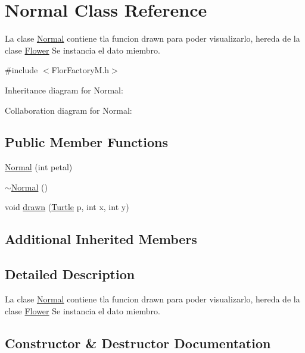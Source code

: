 \hypertarget{classNormal}{}\section{Normal Class Reference}
\label{classNormal}


La clase \hyperlink{classNormal}{Normal} contiene tla funcion drawn para poder visualizarlo, hereda de la clase \hyperlink{classFlower}{Flower}  Se instancia el dato miembro.  




{\ttfamily \#include $<$Flor\+Factory\+M.\+h$>$}



Inheritance diagram for Normal\+:


Collaboration diagram for Normal\+:
\subsection*{Public Member Functions}
\begin{DoxyCompactItemize}
\item 
\hyperlink{classNormal_a03794b0d59e12a6e9c073a596d7709fb}{Normal} (int petal)
\item 
\hyperlink{classNormal_a2ed547e3b7361c3675224d352cf79740}{$\sim$\+Normal} ()
\item 
void \hyperlink{classNormal_aa47b10eb6a4ae2cfceb2b4d234c5ca26}{drawn} (\hyperlink{classTurtle}{Turtle} p, int x, int y)
\end{DoxyCompactItemize}
\subsection*{Additional Inherited Members}


\subsection{Detailed Description}
La clase \hyperlink{classNormal}{Normal} contiene tla funcion drawn para poder visualizarlo, hereda de la clase \hyperlink{classFlower}{Flower}  Se instancia el dato miembro. 

\subsection{Constructor \& Destructor Documentation}
\mbox{\label{classNormal_a03794b0d59e12a6e9c073a596d7709fb}} 
